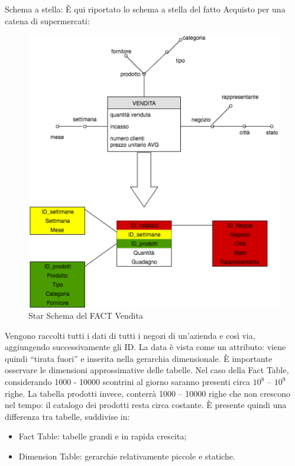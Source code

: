 Schema a stella: È qui riportato lo schema a stella del fatto Acquisto per una catena di supermercati: 

\begin{center}
\begin{figure}[H]
\centering
\includegraphics[scale=1]{figures/supermarket_starschema.png}
\caption{Star Schema del FACT Vendita}
\end{figure}
\end{center}

Vengono raccolti tutti i dati di tutti i negozi di un’azienda e così via, aggiungendo successivamente gli ID. La data è vista come un attributo: viene quindi “tirata fuori” e inserita nella gerarchia dimensionale. È importante osservare le dimensioni approssimative delle tabelle. Nel caso della Fact Table, considerando 1000 - 10000 scontrini al giorno saranno presenti circa $10^8$ – $10^9$ righe. La tabella prodotti invece, conterrà 1000 – 10000 righe che non crescono nel tempo: il catalogo dei prodotti resta circa costante. È presente quindi una differenza tra tabelle, suddivise in:

\begin{itemize}

\item{Fact Table}: tabelle grandi e in rapida crescita;
\item{Dimension Table}: gerarchie relativamente piccole e statiche.
\end{itemize}

